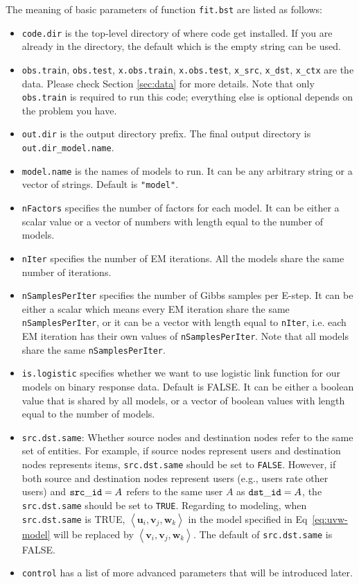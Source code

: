  The meaning of basic parameters of function {\tt fit.bst} are listed as follows:
\begin{itemize}
\item {\tt code.dir} is the top-level directory of where code get installed. If you are already in the directory, the default which is the empty string can be used.
\item {\tt obs.train}, {\tt obs.test}, {\tt x.obs.train}, 
	{\tt x.obs.test}, {\tt x\_src}, {\tt x\_dst}, {\tt x\_ctx} are the data. Please check Section \ref{sec:data} for more details. Note that only {\tt obs.train} is required to run this code; everything else is optional depends on the problem you have.
\item {\tt out.dir} is the output directory prefix. The final output directory is {\tt out.dir\_model.name}. 
\item {\tt model.name} is the names of models to run. It can be any arbitrary string or a vector of strings. Default is {\tt "model"}.
\item {\tt nFactors} specifies the number of factors for each model. It can be either a scalar value or a vector of numbers with length equal to the number of models.
\item {\tt nIter} specifies the number of EM iterations. All the models share the same number of iterations.
\item {\tt nSamplesPerIter} specifies the number of Gibbs samples per E-step. It can be either a scalar which means every EM iteration share the same {\tt nSamplesPerIter}, or it can be a vector with length equal to {\tt nIter}, i.e. each EM iteration has their own values of {\tt nSamplesPerIter}. Note that all models share the same {\tt nSamplesPerIter}.
\item {\tt is.logistic} specifies whether we want to use logistic link function for our models on binary response data. Default is FALSE. It can be either a boolean value that is shared by all models, or a vector of boolean values with length equal to the number of models.
\item {\tt src.dst.same}: Whether source nodes and destination nodes refer to the same set of entities.  For example, if source nodes represent users and destination nodes represents items, {\tt src.dst.same} should be set to {\tt FALSE}.  However, if both source and destination nodes represent users (e.g., users rate other users) and ${\tt src\_id} = A$ refers to the same user $A$ as ${\tt dst\_id} = A$, the {\tt src.dst.same} should be set to {\tt TRUE}. Regarding to modeling, when {\tt src.dst.same} is TRUE, $\left<\bm{u}_i, \bm{v}_j, \bm{w}_k\right>$ in the model specified in Eq~\ref{eq:uvw-model} will be replaced by $\left<\bm{v}_i, \bm{v}_j, \bm{w}_k\right>$. The default of {\tt src.dst.same} is FALSE.
\item {\tt control} has a list of more advanced parameters that will be introduced later.
\end{itemize}

